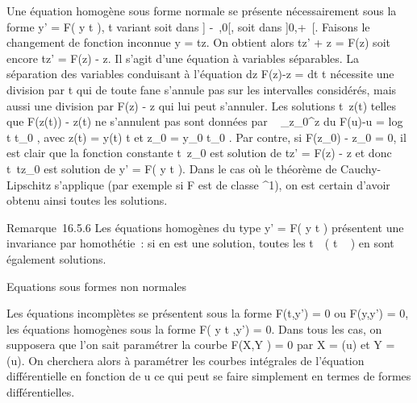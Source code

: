 \documentclass[]{article}
\begin{document}
Une équation homogène sous forme normale se présente nécessairement sous
la forme y' = F( y \over t ), t variant soit dans {]}
-\infty~,0{[}, soit dans {]}0,+\infty~{[}. Faisons le changement de fonction
inconnue y = tz. On obtient alors tz' + z = F(z) soit encore tz' = F(z)
- z. Il s'agit d'une équation à variables séparables. La séparation des
variables conduisant à l'équation  dz \over F(z)-z
= dt \over t nécessite une division par t qui de
toute fa\ccon ne s'annule pas sur les intervalles
considérés, mais aussi une division par F(z) - z qui lui peut s'annuler.
Les solutions t\mapsto~z(t) telles que F(z(t)) -
z(t) ne s'annulent pas sont données par \int ~
\_z\_0^z du \over F(u)-u
= log~ \left \textbar{} t
\over t\_0 \right \textbar{},
avec z(t) = y(t) \over t et z\_0 =
y\_0 \over t\_0 . Par contre, si
F(z\_0) - z\_0 = 0, il est clair que la fonction
constante t\mapsto~z\_0 est solution de tz'
= F(z) - z et donc t\mapsto~tz\_0 est
solution de y' = F( y \over t ). Dans le cas où le
théorème de Cauchy-Lipschitz s'applique (par exemple si F est de classe
^1), on est certain d'avoir obtenu ainsi toutes les
solutions.

Remarque~16.5.6 Les équations homogènes du type y' = F( y
\over t ) présentent une invariance par homothétie~: si
\phi en est une solution, toutes les
t\mapsto~\lambda~\phi\left ( t
\over \lambda~ \right ) en sont également
solutions.

Equations sous formes non normales

Les équations incomplètes se présentent sous la forme F(t,y') = 0 ou
F(y,y') = 0, les équations homogènes sous la forme F( y
\over t ,y') = 0. Dans tous les cas, on supposera que
l'on sait paramétrer la courbe F(X,Y ) = 0 par X = \phi(u) et Y = \psi(u). On
cherchera alors à paramétrer les courbes intégrales de l'équation
différentielle en fonction de u ce qui peut se faire simplement en
termes de formes différentielles.
\end{document}
